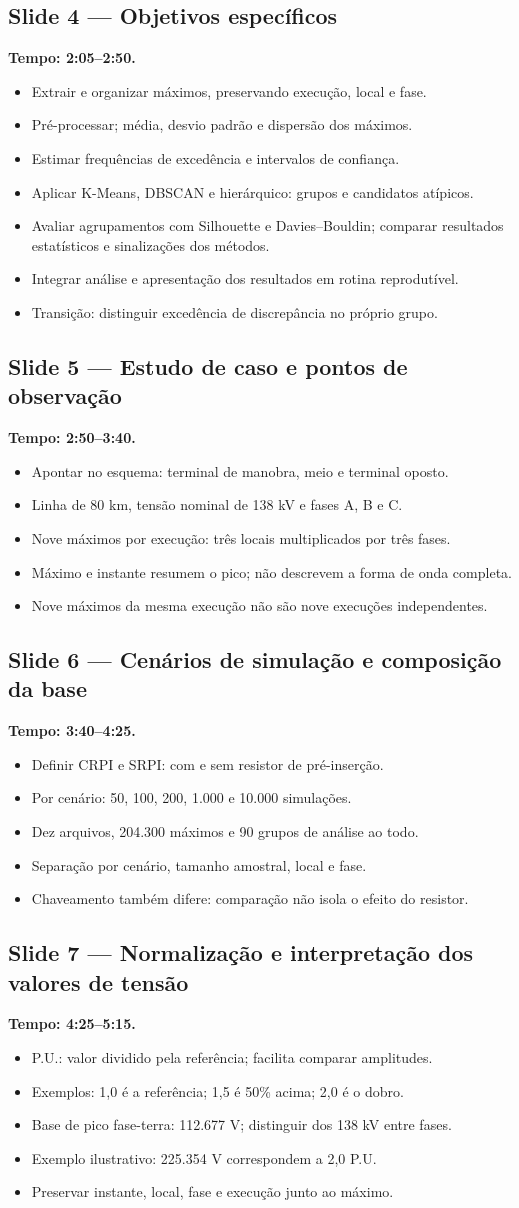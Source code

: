 \documentclass[11pt,a4paper]{article}
\newcommand{\slide}[3]{\Needspace{8\baselineskip}
  \subsection*{Slide #1 --- #2}
  \textbf{Tempo: #3.}\par}
\begin{document}
\slide{4}{Objetivos específicos}{2:05--2:50}
\begin{itemize}
\item Extrair e organizar máximos, preservando execução, local e fase.
\item Pré-processar; média, desvio padrão e dispersão dos máximos.
\item Estimar frequências de excedência e intervalos de confiança.
\item Aplicar K-Means, DBSCAN e hierárquico: grupos e candidatos atípicos.
\item Avaliar agrupamentos com Silhouette e Davies--Bouldin;
comparar resultados estatísticos e sinalizações dos métodos.
\item Integrar análise e apresentação dos resultados em rotina reprodutível.
\item Transição: distinguir excedência de discrepância no próprio grupo.
\end{itemize}

\slide{5}{Estudo de caso e pontos de observação}{2:50--3:40}
\begin{itemize}
\item Apontar no esquema: terminal de manobra, meio e terminal oposto.
\item Linha de 80 km, tensão nominal de 138 kV e fases A, B e C.
\item Nove máximos por execução: três locais multiplicados por três fases.
\item Máximo e instante resumem o pico; não descrevem a forma de onda completa.
\item Nove máximos da mesma execução não são nove execuções independentes.
\end{itemize}

\slide{6}{Cenários de simulação e composição da base}{3:40--4:25}
\begin{itemize}
\item Definir CRPI e SRPI: com e sem resistor de pré-inserção.
\item Por cenário: 50, 100, 200, 1.000 e 10.000 simulações.
\item Dez arquivos, 204.300 máximos e 90 grupos de análise ao todo.
\item Separação por cenário, tamanho amostral, local e fase.
\item Chaveamento também difere: comparação não isola o efeito do resistor.
\end{itemize}

\slide{7}{Normalização e interpretação dos valores de tensão}{4:25--5:15}
\begin{itemize}
\item P.U.: valor dividido pela referência; facilita comparar amplitudes.
\item Exemplos: 1,0 é a referência; 1,5 é 50\% acima; 2,0 é o dobro.
\item Base de pico fase-terra: 112.677 V; distinguir dos 138 kV entre fases.
\item Exemplo ilustrativo: 225.354 V correspondem a 2,0 P.U.
\item Preservar instante, local, fase e execução junto ao máximo.
\end{itemize}
\end{document}

